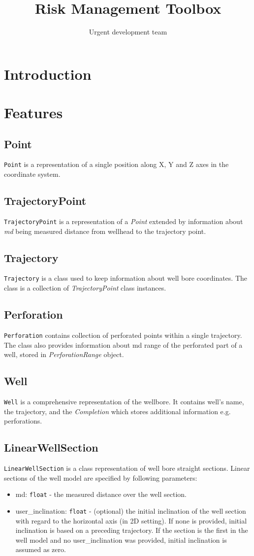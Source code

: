 \documentclass[english,10pt,a4paper]{article}
\title{Risk Management Toolbox}
\author{Urgent development team}
\begin{document}
	\maketitle

	\section{Introduction}

	\section{Features}
	\subsection{Point}
	\texttt{Point} is a representation of a single position along X, Y and Z axes in the coordinate system.
	\subsection{TrajectoryPoint}
	\texttt{TrajectoryPoint} is a representation of a \textit{Point} extended by information about \textit{md} being measured distance from wellhead to the trajectory point.
	\subsection{Trajectory}
	\texttt{Trajectory} is a class used to keep information about well bore coordinates.
	The class is a collection of \textit{TrajectoryPoint} class instances.
	\subsection{Perforation}
	\texttt{Perforation} contains collection of perforated points within a single trajectory. The class also provides information about md range of the perforated part of a well, stored in \textit{PerforationRange} object.
	\subsection{Well}
	\texttt{Well} is a comprehensive representation of the wellbore. It contains well's name, the trajectory, and the \textit{Completion} which stores additional information e.g. perforations.
	\subsection{LinearWellSection}
	\texttt{LinearWellSection} is a class representation of well bore straight sections. Linear sections of the well model are specified by following parameters:
	\begin{itemize}
		\item  \colorbox{gray!20}{md:} \texttt{float} - the measured distance over the well section.
		\item  \colorbox{gray!20}{user\_inclination:} \texttt{float} - (optional) the initial inclination of the well section with regard to the horizontal axis (in 2D setting). If none is provided, initial inclination is based on a preceding trajectory. If the section is the first in the well model and no user\_inclination was provided, initial inclination is assumed as zero.
	\end{itemize}
\end{document}
